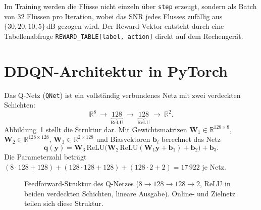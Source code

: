 Im Training werden die Flüsse nicht einzeln über \texttt{step} erzeugt, sondern als Batch von 32 Flüssen pro Iteration, wobei das SNR jedes Flusses zufällig aus $\{30,20,10,5\}$\,dB gezogen wird. Der Reward-Vektor entsteht durch eine Tabellenabfrage \texttt{REWARD\_TABLE[label, action]} direkt auf dem Rechengerät.

\section{DDQN-Architektur in PyTorch}
\label{sec:dqn_architektur}

Das Q-Netz (\texttt{QNet}) ist ein vollständig verbundenes Netz mit zwei verdeckten Schichten:
\begin{equation}
	\mathbb{R}^{8}\ \to\ \underbrace{128}_{\text{ReLU}}\ \to\ \underbrace{128}_{\text{ReLU}}\ \to\ \mathbb{R}^{2}.
\end{equation}
Abbildung~\ref{fig:qnet_architektur} stellt die Struktur dar. Mit Gewichtsmatrizen $\mathbf{W}_1\in\mathbb{R}^{128\times8}$, $\mathbf{W}_2\in\mathbb{R}^{128\times128}$, $\mathbf{W}_3\in\mathbb{R}^{2\times128}$ und Biasvektoren $\mathbf{b}_i$ berechnet das Netz
\begin{equation}
	\mathbf{q}(\mathbf{y})=\mathbf{W}_3\,\mathrm{ReLU}\!\bigl(\mathbf{W}_2\,\mathrm{ReLU}(\mathbf{W}_1\mathbf{y}+\mathbf{b}_1)+\mathbf{b}_2\bigr)+\mathbf{b}_3 .
\end{equation}
Die Parameterzahl beträgt $(8\cdot128+128)+(128\cdot128+128)+(128\cdot2+2)=17\,922$ je Netz.

\begin{figure}[htbp]
	\centering
	\caption[Feedforward-Struktur des Q-Netzes]{Feedforward-Struktur des Q-Netzes ($8\to128\to128\to2$, ReLU in beiden verdeckten Schichten, lineare Ausgabe). Online- und Zielnetz teilen sich diese Struktur.}
	\label{fig:qnet_architektur}
\end{figure}

